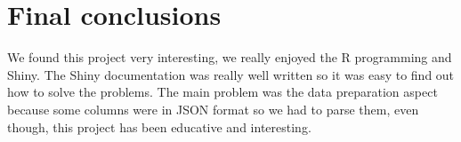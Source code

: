 \section{Final conclusions}

We found this project very interesting, we really enjoyed the R programming and Shiny. The Shiny documentation was really well written so it was easy to find out how to solve the problems. The main problem was the data preparation aspect because some columns were in JSON format so we had to parse them, even though, this project has been educative and interesting.\\

